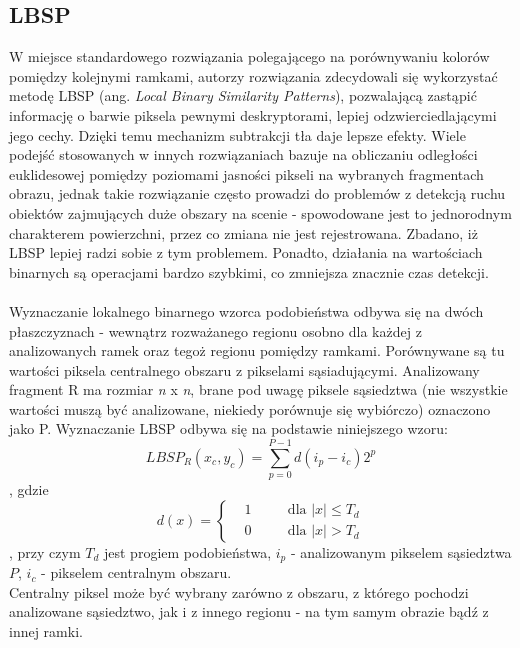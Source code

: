 \subsection{LBSP}
\label{sec:LBSP}
W miejsce standardowego rozwiązania polegającego na porównywaniu kolorów pomiędzy kolejnymi ramkami, autorzy rozwiązania zdecydowali się wykorzystać metodę LBSP \cite{bilodeau2013change} (ang. \textit{Local Binary Similarity Patterns}), pozwalającą zastąpić informację o barwie piksela pewnymi deskryptorami, lepiej odzwierciedlającymi jego cechy. Dzięki temu mechanizm subtrakcji tła daje lepsze efekty. Wiele podejść stosowanych w innych rozwiązaniach bazuje na obliczaniu odległości euklidesowej pomiędzy poziomami jasności pikseli na wybranych fragmentach obrazu, jednak takie rozwiązanie często prowadzi do problemów z detekcją ruchu obiektów zajmujących duże obszary na scenie - spowodowane jest to jednorodnym charakterem powierzchni, przez co zmiana nie jest rejestrowana. Zbadano, iż LBSP lepiej radzi sobie z tym problemem. Ponadto, działania na wartościach binarnych są operacjami bardzo szybkimi, co zmniejsza znacznie czas detekcji.
\paragraph{}
Wyznaczanie lokalnego binarnego wzorca podobieństwa odbywa się na dwóch płaszczyznach - wewnątrz rozważanego regionu osobno dla każdej z analizowanych ramek oraz tegoż regionu pomiędzy ramkami. Porównywane są tu wartości piksela centralnego obszaru z pikselami sąsiadującymi. Analizowany fragment R ma rozmiar \textit{n} x \textit{n}, brane pod uwagę piksele sąsiedztwa (nie wszystkie wartości muszą być analizowane, niekiedy porównuje się wybiórczo) oznaczono jako P. Wyznaczanie LBSP odbywa się na podstawie niniejszego wzoru:
\begin{equation}
LBSP_{R}(x_{c},y_{c}) = 
\sum_{p=0}^{P-1}d(i_{p}-i_{c})2^p
\end{equation},
gdzie
\begin{equation}
d(x)=\left\{
\begin{split}
&1 & \quad &\text{dla $|x|\leq T_{d}$} \\
&0 & \quad &\text{dla $|x|>T_{d}$}
\end{split}
\right.
\end{equation}
, przy czym $T_{d}$ jest progiem podobieństwa, $i_{p}$ - analizowanym pikselem sąsiedztwa $P$, $i_{c}$ - pikselem centralnym obszaru.\\
Centralny piksel może być wybrany zarówno z obszaru, z którego pochodzi analizowane sąsiedztwo, jak i z innego regionu - na tym samym obrazie bądź z innej ramki.
